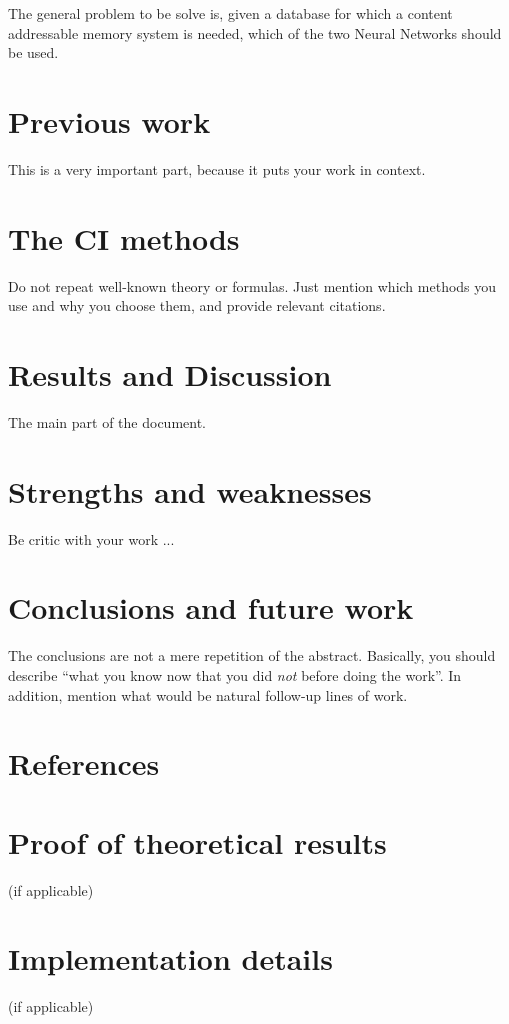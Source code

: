 \documentclass[anon]{CI}
\begin{document}
The general problem to be solve is, given a database for which a content addressable memory system is needed, which of the two Neural Networks should be used. 

\cite{Ackley1985147}


\section{Previous work}

This is a very important part, because it puts your work in context.

\section{The CI methods}

Do not repeat well-known theory or formulas. Just mention which methods you use and why you choose them, and provide relevant citations. 

\section{Results and Discussion}

The main part of the document.

\section{Strengths and weaknesses}

Be critic with your work ...

\section{Conclusions and future work}

The conclusions are not a mere repetition of the abstract. Basically, you should describe ``what you know now that you did \emph{not} before doing the work''. In addition, mention what would be natural follow-up lines of work.

\section*{References}





\appendix

\section{Proof of theoretical results} (if applicable)

\section{Implementation details} (if applicable)
\end{document}
